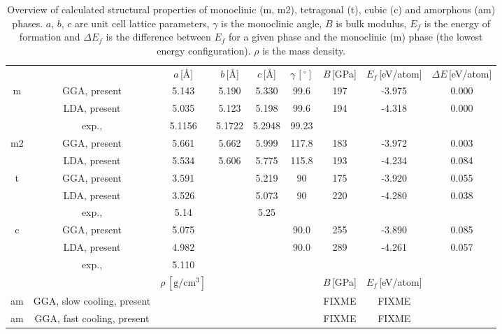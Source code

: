 \documentclass[10pt,a4paper,twocolumn]{article}
\begin{document}
\begin{table}
\begin{center}
\begin{tabular}{ccccccccc}

 & & $a$\,[\AA] & $b$\,[\AA] & $c$\,[\AA] & $\gamma\,[^{\circ}]$ &
$B$\,[GPa] & $E_f$\,[eV/atom] & $\Delta E$\,[eV/atom]\\
m & GGA, present & 5.143 & 5.190 & 5.330 & 99.6 & 197 & -3.975 & 0.000
\\%
  & LDA, present & 5.035 & 5.123 & 5.198 & 99.6 & 194 & -4.318 & 0.000
\\%
  & exp., \citet{Adam1959} & 5.1156 & 5.1722 & 5.2948 & 99.23 & & & \\

m2 & GGA, present & 5.661 & 5.662 & 5.999 & 117.8 & 183 & -3.972 &
0.003\\ %
   & LDA, present & 5.534 & 5.606 & 5.775 & 115.8 & 193 & -4.234 &
0.084\\ %

t & GGA, present & 3.591 & & 5.219 & 90 & 175 & -3.920 & 0.055\\ %
  & LDA, present & 3.526 & & 5.073 & 90 & 220 & -4.280 & 0.038\\ %
  & exp., \citet{Curtis1954} & 5.14 & & 5.25 & & & & \\

c & GGA, present & 5.075 & & & 90.0 & 255 & -3.890 & 0.085 \\%
  & LDA, present & 4.982 & & & 90.0 & 289 & -4.261 & 0.057 \\%
  & exp., \citet{Senft1983} & 5.110 & & & & & & \\


 & &  $\rho\,[\mathrm{g/cm^3}]$ & & & & $B$\,[GPa] & $E_f$\,[eV/atom] & \\
 am & GGA, slow cooling, present &  & & & & FIXME & FIXME & \\ %
 am & GGA, fast cooling, present &  & & & & FIXME & FIXME &\\ %

\end{tabular}
\caption{Overview of calculated structural properties of monoclinic (m, m2), tetragonal (t), cubic (c) and amorphous (am) phases. $a$, $b$, $c$ are unit cell lattice parameters, $\gamma$ is the monoclinic angle, $B$ is bulk modulus, $E_f$ is the energy of formation and $\Delta E_f$ is the difference between $E_f$ for a given phase and the monoclinic (m) phase (the lowest energy configuration). $\rho$ is the mass density.}
\label{structure}
\end{center}
\end{table}
\end{document}
